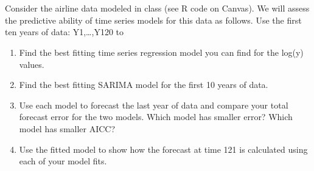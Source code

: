 \documentclass[12pt]{article}
\newenvironment{problem}[2][Problem]{\begin{trivlist}
	\item[\hskip \labelsep {\bfseries #1}\hskip \labelsep {\bfseries #2.}]}{\end{trivlist}}
\begin{document}
	\begin{problem}{8}
	$ $ \\
	$ $ \\
	Consider the airline data modeled in class (see R code on Canvas).  We will assess the predictive ability of time series models for this data as follows.  Use the first ten years of data: Y1,\ldots,Y120 to 
	\begin{enumerate}[label=(\alph*)]
		\item Find the best fitting time series regression model you can find for the log(y) values.
		\item Find the best fitting SARIMA model for the first 10 years of data.
		\item	Use each model to forecast the last year of data and compare your total forecast error for the two models.  Which 	model has smaller error?  Which model has smaller AICC? 
		\item	Use the fitted model to show how the forecast at time 121 is calculated using each of your model fits.    
	\end{enumerate}
	\end{problem}
		
\end{document}
